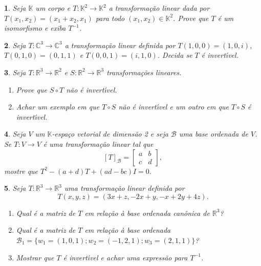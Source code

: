 \documentclass[12pt]{exam}
\newtheorem{exercicio}{}
\newcommand{\real}{\mathbb{R}}
\newcommand{\complex}{\mathbb{C}}
\newcommand{\cp}[1]{\mathbb{#1}}
\begin{document}
\begin{exercicio}
  Seja $\cp{K}$ um corpo e $T : \cp{K}^2 \to \cp{K}^2$ a transforma\c{c}\~ao linear dada por $T(x_1,x_2) = (x_1 + x_2, x_1)$ para todo $(x_1,x_2) \in \cp{K}^2$. Prove que $T$ \'e um isomorfismo e exiba $T^{-1}$.
\end{exercicio}

\begin{exercicio}
  Seja $T : \complex^3 \to \complex^3$ a transforma\c{c}\~ao linear definida por $T(1,0,0) = (1,0,i)$, $T(0,1,0) = (0,1,1)$ e $T(0,0,1) = (i,1,0)$. Decida se $T$ \'e invert{\'\i}vel.
\end{exercicio}

\begin{exercicio}
  Seja $T : \real^3 \to \real^2$ e $S : \real^2 \to \real^3$ transforma\c{c}\~oes lineares.
  \begin{enumerate}[label=({\alph*})]
    \item Prove que $S \circ T$ n\~ao \'e invert{\'\i}vel.
    \item Achar um exemplo em que $T\circ S$ n\~ao \'e invert{\'\i}vel e um outro em que $T\circ S$ \'e invert{\'\i}vel.
  \end{enumerate}
\end{exercicio}

\begin{exercicio}
  Seja $V$ um $\cp{K}$-espa\c{c}o vetorial de dimens\~ao 2 e seja $\mathcal{B}$ uma base ordenada de $V$. Se $T: V \to V$ \'e uma transforma\c{c}\~ao linear tal que
  \[
    [T]_\mathcal{B} = \begin{bmatrix}
      a & b\\
      c & d
    \end{bmatrix},
  \]
  mostre que $T^2 - (a + d)T + (ad - bc)I = 0$.
\end{exercicio}

\begin{exercicio}
  Seja $T : \real^3 \to \real^3$ uma transforma\c{c}\~ao linear definida por
  \[
    T(x,y,z) = (3x + z,-2x + y,-x+2y + 4z).
  \]
  \begin{enumerate}[label=({\alph*})]
    \item Qual \'e a matriz de $T$ em rela\c{c}\~ao \`a base ordenada can\^onica de $\real^3$?
    \item Qual \'e a matriz de $T$ em rela\c{c}\~ao \`a base ordenada $\mathcal{B}_1 = \{w_1 = (1,0,1); w_2 = (-1,2,1); w_3 = (2,1,1)\}$?
    \item Mostrar que $T$ \'e invert{\'\i}vel e achar uma express\~ao para $T^{-1}$.
  \end{enumerate}
\end{exercicio}
\end{document}
